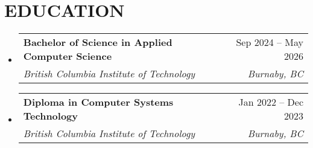 \documentclass[letterpaper,11pt]{article}
\makeatletter
\newcommand{\resumeSubheading}[4]{
  \vspace{-2pt}\item
    \begin{tabular*}{0.97\textwidth}[t]{l@{\extracolsep{\fill}}r}
      \textbf{#1} & #2 \\
      \textit{\small#3} & \textit{\small #4} \\
    \end{tabular*}\vspace{-7pt}
}
\newcommand{\resumeSubHeadingListStart}{\begin{itemize}[leftmargin=0.15in, label={}]}
\newcommand{\resumeSubHeadingListEnd}{\end{itemize}}
\makeatother
\begin{document}
\section{EDUCATION}
\resumeSubHeadingListStart

\resumeSubheading
{Bachelor of Science in Applied Computer Science}{Sep 2024 -- May 2026}
{British Columbia Institute of Technology}{Burnaby, BC}

\resumeSubheading
{Diploma in Computer Systems Technology}{Jan 2022 -- Dec 2023}
{British Columbia Institute of Technology}{Burnaby, BC}


\resumeSubHeadingListEnd


\end{document}
